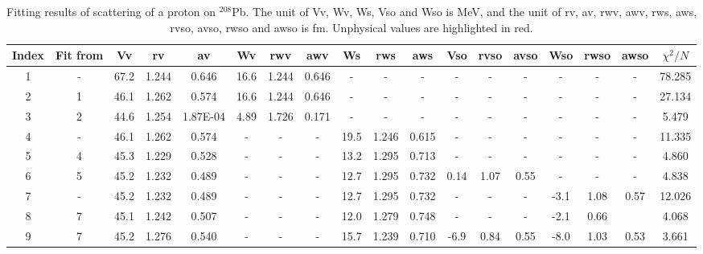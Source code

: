 \begin{landscape}
	\begin{table}[t]
		\centering
		\caption{Fitting results of scattering of a proton on $^{208}$Pb. 
		The unit of Vv, Wv, Ws, Vso and Wso is MeV, and the unit of rv, av, rwv, awv, rws, aws, rvso, avso, rwso and awso is fm. 
	    Unphysical values are highlighted in red. }
		\label{proton_table}
		\footnotesize
		\begin{tabular}{cccccccccccccccccc}
			\hline
			\hline
			Index & Fit from & Vv  & rv  & av  & Wv & rwv & awv  & Ws & rws & aws & Vso & rvso & avso & Wso & rwso & awso & $\chi^2/N$ \\
			\hline
			1     & -          & 67.2     & 1.244   & 0.646    & 16.6     & 1.244    & 0.646    & -        & -        & -        & -         & -         & -         & -         & -         & -        & 78.285   \\
			2     & 1          & 46.1     & 1.262   & 0.574    & 16.6     & 1.244    & 0.646    & -        & -        & -        & -         & -         & -         & -         & -         & -        & 27.134   \\
			3     & 2          & 44.6     & 1.254   & 1.87E-04 & 4.89     & 1.726    & 0.171    & -        & -        & -        & -         & -         & -         & -         & -         & -        & 5.479    \\
			4     & -          & 46.1     & 1.262   & 0.574    & -        & -        & -        & 19.5     & 1.246    & 0.615    & -         & -         & -         & -         & -         & -        & 11.335   \\
			5     & 4          & 45.3     & 1.229   & 0.528    & -        & -        & -        & 13.2     & 1.295    & 0.713    & -         & -         & -         & -         & -         & -        & 4.860    \\
			6     & 5          & 45.2     & 1.232   & 0.489    & -        & -        & -        & 12.7     & 1.295    & 0.732    & 0.14     & 1.07     & 0.55     & -         & -         & -        & 4.838    \\
			7     & -          & 45.2     & 1.232   & 0.489    & -        & -        & -        & 12.7     & 1.295    & 0.732    & -         & -         & -         & -3.1    & 1.08      & 0.57     & 12.026   \\
			8     & 7          & 45.1     & 1.242   & 0.507    & -        & -        & -        & 12.0     & 1.279    & 0.748    & -         & -         & -         & -2.1     & 0.66     & \color{red}{-0.028}   & 4.068    \\
			9     & 7          & 45.2     & 1.276   & 0.540    & -        & -        & -        & 15.7     & 1.239    & 0.710    & -6.9     & 0.84     & 0.55     & -8.0     & 1.03      & 0.53     & 3.661   \\
			\hline
			\hline
		\end{tabular}
	\end{table}


\end{landscape}
